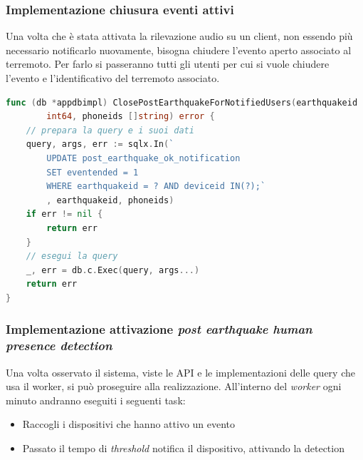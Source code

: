\documentclass[main.tex]{subfiles}
\begin{document}
\subsubsection{Implementazione chiusura eventi attivi}
Una volta che è stata attivata la rilevazione audio su un client, non essendo più necessario notificarlo nuovamente, bisogna chiudere l'evento aperto associato al terremoto. Per farlo si passeranno tutti gli utenti per cui si vuole chiudere l'evento e l'identificativo del terremoto associato.
\begin{lstlisting}[language=go]
func (db *appdbimpl) ClosePostEarthquakeForNotifiedUsers(earthquakeid 
        int64, phoneids []string) error {
    // prepara la query e i suoi dati
    query, args, err := sqlx.In(`
        UPDATE post_earthquake_ok_notification 
        SET eventended = 1 
        WHERE earthquakeid = ? AND deviceid IN(?);`
        , earthquakeid, phoneids)
    if err != nil {
        return err
    }
    // esegui la query
    _, err = db.c.Exec(query, args...)
    return err
}

\end{lstlisting}

\subsubsection{Implementazione attivazione \emph{post earthquake human presence detection}}
Una volta osservato il sistema, viste le API e le implementazioni delle query che usa il worker, si può proseguire alla realizzazione.\newline
All'interno del \emph{worker} ogni minuto andranno eseguiti i seguenti task:
\begin{itemize}
    \item Raccogli i dispositivi che hanno attivo un evento
    \item Passato il tempo di \emph{threshold} notifica il dispositivo, attivando la detection
\end{itemize}
\end{document}
